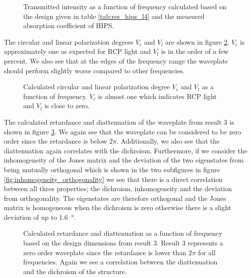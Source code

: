\begin{figure}[H]
    \centering
    
    \caption{Transmitted intensity as a function of frequency calculated based on the design given in table \ref{tab:res_hips_l4} and the measured absorption coefficient of HIPS.}
    \label{fig:polymer_intensity}
\end{figure}

The circular and linear polarization degrees $V_c$ and $V_l$ are shown in figure \ref{fig:polymer_pol_deg}. $V_c$ is approximately one as expected for RCP light and $V_l$ is in the order of a few percent. We also see that at the edges of the frequency range the waveplate should perform slightly worse compared to other frequencies.

\begin{figure}[H]
    \centering
    
    \caption{Calculated circular and linear polarization degree $V_c$ and $V_l$ as a function of frequency. $V_c$ is almost one which indicates RCP light and $V_l$ is close to zero.}
    \label{fig:polymer_pol_deg}
\end{figure}

The calculated retardance and diattenuation of the waveplate from result 3 is shown in figure \ref{fig:polymer_ret_and_diat}. We again see that the waveplate can be considered to be zero order since the retardance is below $2\pi$. Additionally, we also see that the diattenuation again correlates with the dichroism. Furthermore, if we consider the inhomogeneity of the Jones matrix and the deviation of the two eigenstates from being mutually orthogonal which is shown in the two subfigures in figure \ref{fig:inhomogeneity_orthogonality} we see that there is a direct correlation between all three properties; the dichroism, inhomogeneity and the deviation from orthogonality. The eigenstates are therefore orthogonal and the Jones matrix is homogeneous when the dichroism is zero otherwise there is a slight deviation of up to \SI{1.6}{\degree}. 

\begin{figure}[H]
    \centering
    
    \caption{Calculated retardance and diattenuation as a function of frequency based on the design dimensions from result 3. Result 3 represents a zero order waveplate since the retardance is lower than $2\pi$ for all frequencies. Again we see a correlation between the diattenuation and the dichroism of the structure.}
    \label{fig:polymer_ret_and_diat}
\end{figure}

